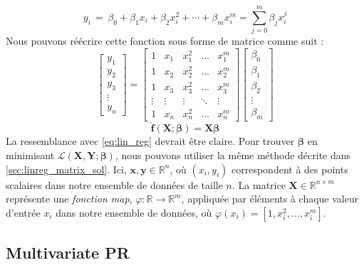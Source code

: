 {\begin{equation}
y_i \,=\, \beta_0 + \beta_1 x_i + \beta_2 x_i^2 + \cdots + \beta_m x_i^m = \sum_{j=0}^{m} \beta_j x_i^{j}
\end{equation}
%
Nous pouvons réécrire cette fonction sous forme de matrice comme suit :
%
\begin{equation}
\begin{bmatrix} y_1\\ y_2\\ y_3 \\ \vdots \\ y_n \end{bmatrix}= \begin{bmatrix} 1 & x_1 & x_1^2 & \dots & x_1^m \\ 1 & x_2 & x_2^2 & \dots & x_2^m \\ 1 & x_3 & x_3^2 & \dots & x_3^m \\ \vdots & \vdots & \vdots & \ddots & \vdots \\ 1 & x_n & x_n^2 & \dots & x_n^m \end{bmatrix} \begin{bmatrix} \beta_0\\ \beta_1\\ \beta_2\\ \vdots \\ \beta_m \end{bmatrix}
\end{equation}
%
\begin{equation}
\mathbf{\hat f}(\mathbf{X}; \bm\beta) = \mathbf{X}\bm\beta
\end{equation}
%
La ressemblance avec \autoref{eq:lin_reg} devrait être claire. Pour trouver $\bm\beta$ en minimisant $\mathcal L(\mathbf{X}, \mathbf{Y};\bm\beta)$, nous pouvons utiliser la même méthode décrite dans \autoref{sec:linreg_matrix_sol}. Ici, $\mathbf x, \mathbf y \in \mathbb R^n$, où $(x_i, y_i)$ correspondent à des points scalaires dans notre ensemble de données de taille $n$. La matrice $\mathbf X \in \mathbb R^{n \times m}$ représente une \textit{fonction map}, $\varphi : \mathbb R \rightarrow \mathbb R^m$, appliquée par éléments à chaque valeur d'entrée $x_i$ dans notre ensemble de données, où $\varphi(x_i) = \left[1, x_i^2, \ldots, x_i^m\right]$.

\subsection{Multivariate PR}

}

